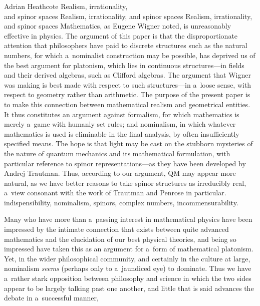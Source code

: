 \begin{artengenv}{Adrian Heathcote}
	{Realism, irrationality,\\and spinor spaces}
	{Realism, irrationality, and spinor spaces}
	{Realism, irrationality, and spinor spaces}
	{
	}
	{Mathematics, as Eugene Wigner noted, is unreasonably effective in physics. The argument of this paper is that the disproportionate attention that philosophers have paid to discrete structures such as the natural numbers, for which a~nominalist construction may be possible, has deprived us of the best argument for platonism, which lies in continuous structures---in fields and their derived algebras, such as Clifford algebras. The argument that Wigner was making is best made with respect to such structures---in a~loose sense, with respect to geometry rather than arithmetic. The purpose of the present paper is to make this connection between mathematical realism and geometrical entities. It thus constitutes an argument against formalism, for which mathematics is merely a~game with humanly set rules; and nominalism, in which whatever mathematics is used is eliminable in the final analysis, by often insufficiently specified means. The hope is that light may be cast on the stubborn mysteries of the nature of quantum mechanics and its mathematical formulation, with particular reference to spinor representations---as they have been developed by Andrej Trautman. Thus, according to our argument, QM may appear more natural, as we have better reasons to take spinor structures as irreducibly real, a~view consonant with the work of Trautman and Penrose in particular.
	}
	{indispensibility, nominalism, spinors, complex numbers, incommensurability.}




\lettrine[loversize=0.13,lines=2,lraise=-0.03,nindent=0em,findent=0.2pt]%
{M}{}any who have more than a~passing interest in mathematical physics have been impressed by the intimate connection that exists between quite advanced mathematics and the elucidation of our best physical theories, and being so impressed have taken this as an argument for a~form of mathematical platonism. Yet, in the wider philosophical community, and certainly in the culture at large, nominalism \textit{seems} (perhaps only to a~jaundiced eye) to dominate. Thus we have a~rather stark opposition between philosophy and science in which the two sides appear to be largely talking past one another, and little that is said advances the debate in a~successful manner,


\end{artengenv}
